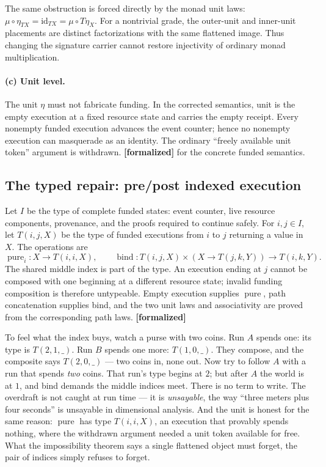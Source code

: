 \documentclass[11pt]{article}
\newcommand{\formalized}{\textbf{[formalized]}}
\begin{document}
The same obstruction is forced directly by the monad unit laws:
$\mu\circ\eta_{TX}=\mathrm{id}_{TX}=\mu\circ T\eta_X$.  For a nontrivial
grade, the outer-unit and inner-unit placements are distinct factorizations
with the same flattened image.  Thus changing the signature carrier cannot
restore injectivity of ordinary monad multiplication.

\paragraph{(c) Unit level.} The unit $\eta$ must not fabricate funding.
In the corrected semantics, unit is the empty execution at a fixed resource
state and carries the empty receipt.  Every nonempty funded execution advances
the event counter; hence no nonempty execution can masquerade as an identity.
The ordinary ``freely available unit token'' argument is withdrawn.
\formalized{} for the concrete funded semantics.

\subsection{The typed repair: pre/post indexed execution}

Let $I$ be the type of complete funded states: event counter, live resource
components, provenance, and the proofs required to continue safely.  For
$i,j\in I$, let $T(i,j,X)$ be the type of funded executions from $i$ to $j$
returning a value in $X$.  The operations are
\[
  \operatorname{pure}_i : X \to T(i,i,X),
  \qquad
  \operatorname{bind} :
    T(i,j,X) \times (X \to T(j,k,Y)) \to T(i,k,Y).
\]
The shared middle index is part of the type.  An execution ending at $j$ cannot
be composed with one beginning at a different resource state; invalid funding
composition is therefore untypeable.  Empty execution supplies
$\operatorname{pure}$, path concatenation supplies bind, and the two unit laws
and associativity are proved from the corresponding path laws.
\formalized

To feel what the index buys, watch a purse with two coins.  Run $A$
spends one: its type is $T(2,1,\_)$.  Run $B$ spends one more:
$T(1,0,\_)$.  They compose, and the composite says $T(2,0,\_)$ --- two
coins in, none out.  Now try to follow $A$ with a run that spends
\emph{two} coins.  That run's type begins at $2$; but after $A$ the world
is at $1$, and bind demands the middle indices meet.  There is no term to
write.  The overdraft is not caught at run time --- it is
\emph{unsayable}, the way ``three meters plus four seconds'' is unsayable
in dimensional analysis.  And the unit is honest for the same reason:
$\operatorname{pure}$ has type $T(i,i,X)$, an execution that provably
spends nothing, where the withdrawn argument needed a unit token
available for free.  What the impossibility theorem says a single
flattened object must forget, the pair of indices simply refuses to
forget.{}
\end{document}
